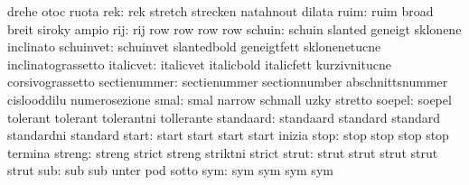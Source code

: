                            drehe                     otoc
                           ruota
                      rek: rek                       stretch
                           strecken                  natahnout
                           dilata
                     ruim: ruim                      broad
                           breit                     siroky
                           ampio
                      rij: rij                       row
                           row                       row
                           row                       %
                   schuin: schuin                    slanted
                           geneigt                   sklonene
                           inclinato
                schuinvet: schuinvet                 slantedbold
                           geneigtfett               sklonenetucne
                           inclinatograssetto
                italicvet: italicvet                 italicbold
                           italicfett                kurzivnitucne
                           corsivograssetto
             sectienummer: sectienummer              sectionnumber
                           abschnittsnummer          cislooddilu
                           numerosezione
                     smal: smal                      narrow
                           schmall                   uzky
                           stretto
                   soepel: soepel                    tolerant
                           tolerant                  tolerantni
                           tollerante
                standaard: standaard                 standard
                           standard                  standardni
                           standard
                    start: start                     start
                           start                     start
                           inizia
                     stop: stop                      stop
                           stop                      stop
                           termina
                   streng: streng                    strict
                           streng                    striktni
                           strict                    %
                    strut: strut                     strut
                           strut                     strut
                           strut
                      sub: sub                       sub
                           unter                     pod
                           sotto
                      sym: sym                       sym
                           sym                       sym
